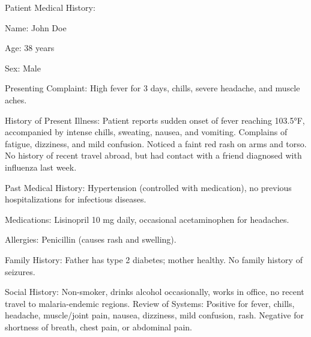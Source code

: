 Patient Medical History:

Name: John Doe

Age: 38 years

Sex: Male

Presenting Complaint: High fever for 3 days, chills, severe headache, and muscle aches.

History of Present Illness: Patient reports sudden onset of fever reaching 103.5°F, accompanied by intense chills, sweating, nausea, and vomiting. Complains of fatigue, dizziness, and mild confusion. Noticed a faint red rash on arms and torso. No history of recent travel abroad, but had contact with a friend diagnosed with influenza last week.

Past Medical History: Hypertension (controlled with medication), no previous hospitalizations for infectious diseases.

Medications: Lisinopril 10 mg daily, occasional acetaminophen for headaches.

Allergies: Penicillin (causes rash and swelling).

Family History: Father has type 2 diabetes; mother healthy. No family history of seizures.

Social History: Non-smoker, drinks alcohol occasionally, works in office, no recent travel to malaria-endemic regions.
Review of Systems: Positive for fever, chills, headache, muscle/joint pain, nausea, dizziness, mild confusion, rash. Negative for shortness of breath, chest pain, or abdominal pain.